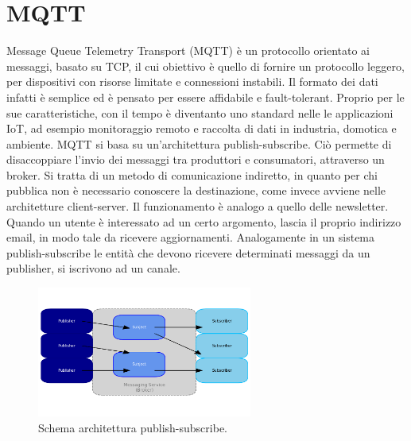 \section{MQTT} %
Message Queue Telemetry Transport (MQTT) è un protocollo orientato ai messaggi, basato su TCP, il cui obiettivo è quello di fornire un protocollo leggero, per dispositivi con risorse limitate e connessioni instabili. Il formato dei dati infatti è semplice ed è pensato per essere affidabile e fault-tolerant. Proprio per le sue caratteristiche, con il tempo è diventanto uno standard nelle le applicazioni IoT, ad esempio monitoraggio remoto e raccolta di dati in industria, domotica e ambiente. MQTT si basa su un'architettura publish-subscribe. Ciò permette di disaccoppiare l'invio dei messaggi tra produttori e consumatori, attraverso un broker. Si tratta di un metodo di comunicazione indiretto, in quanto per chi pubblica non è necessario conoscere la destinazione, come invece avviene nelle architetture client-server. Il funzionamento è analogo a quello delle newsletter. Quando un utente è interessato ad un certo argomento, lascia il proprio indirizzo email, in modo tale da ricevere aggiornamenti. Analogamente in un sistema publish-subscribe le entità che devono ricevere determinati messaggi da un publisher, si iscrivono ad un canale. 

\begin{figure}[htbp]
    \centering
    \includegraphics[width=0.63\textwidth]{figures/pub-sub-arch.png}
    \caption{Schema architettura publish-subscribe.}
    \label{fig:pub-sub}
\end{figure}

